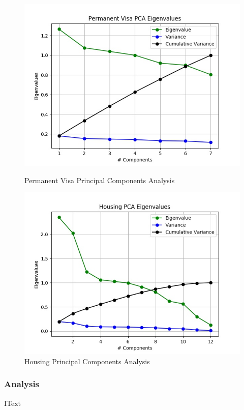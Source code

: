 \documentclass[h]{article}
\begin{document}
 \begin{figure}[H]
      \includegraphics[width=1\textwidth,keepaspectratio]{permanent_visa_pca_eigenvalues.jpg} 
      \caption*{Permanent Visa Principal Components Analysis } 
   \endminipage\hfill
      \includegraphics[width=1\textwidth,keepaspectratio]{housing_pca_eigenvalues.jpg} 
      \caption*{Housing Principal Components Analysis } 
   \endminipage\hfill
\end{figure}

\subsubsection*{Analysis}
IText
\end{document}

